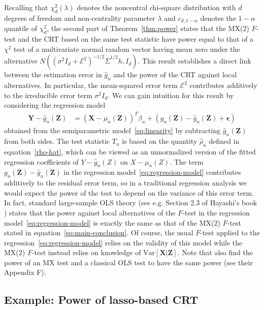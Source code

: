 \documentclass[12pt]{article}
\theoremstyle{definition}
\theoremstyle{remark}
\newcommand{\eps}{\epsilon}
\newcommand{\prx}{\bm X}
\newcommand{\srx}{X}
\newcommand{\prz}{\bm Z}
\newcommand{\srz}{Z}
\newcommand{\pry}{{\bm Y}}
\newcommand{\sry}{Y}
\begin{document}
Recalling that $\chi^2_d(\lambda)$ denotes the noncentral chi-square distribution with $d$ degrees of freedom and non-centrality parameter $\lambda$ and $c_{d,1-\alpha}$ denotes the $1-\alpha$ quantile of $\chi^2_d$, the second part of Theorem~\ref{thm:power} states that the MX(2) $F$-test and the CRT based on the same test statistic have power equal to that of a $\chi^2$ test of a multivariate normal random vector having mean zero under the alternative $N((\sigma^2I_d +\mathcal E^2)^{-1/2}\overline \Sigma^{1/2} h, I_d)$. This result establishes a direct link between the estimation error in $\widehat g_n$ and the power of the CRT against local alternatives. In particular, the mean-squared error term $\mathcal E^2$ contributes additively to the irreducible error term $\sigma^2 I_d$. We can gain intuition for this result by considering the regression model
\begin{equation}
\begin{split}
\pry - \widehat g_n(\prz) &= (\prx - \mu_n(\prz))^T\beta_n + (g_n(\prz) - \widehat g_n(\prz) + \bm \eps)
\label{eq:regression-model}
\end{split}
\end{equation}
obtained from the semiparametric model~\eqref{eq:linearity} by subtracting $\widehat g_n(\prz)$ from both sides. The test statistic $T_n$ is based on the quantity $\widehat \rho_n$ defined in equation~\eqref{rho-hat}, which can be viewed as an unnormalized version of the fitted regression coefficients of $\sry - \widehat g_n(\srz)$ on $\srx - \mu_n(\srz)$. The term $g_n(\prz) - \widehat g_n(\prz)$ in the regression model~\eqref{eq:regression-model} contributes additively to the residual error term, so in a traditional regression analysis we would expect the power of the test to depend on the variance of this error term. In fact, standard large-sample OLS theory (see e.g. Section 2.3 of Hayashi's book \cite{Hayashi2000}) states that the power against local alternatives of the $F$-test in the regression model~\eqref{eq:regression-model} is exactly the same as that of the MX(2) $F$-test stated in equation~\eqref{eq:main-conclusion}. Of course, the usual $F$-test applied to the regression~\eqref{eq:regression-model} relies on the validity of this model while the MX(2) $F$-test instead relies on knowledge of $\text{Var}[\prx|\prz]$. Note that \cite{Wang2020b} also find the power of an MX test and a classical OLS test to have the same power (see their Appendix F).

\subsection{Example: Power of lasso-based CRT} \label{sec:power-lasso-based}
\end{document}
